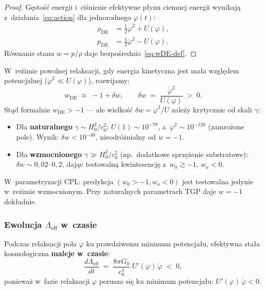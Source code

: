 \begin{proof}
G\k{e}sto\'s\'c energii i~ci\'snienie efektywne p\l{}ynu ciemnej
energii wynikaj\k{a} z~dzia\l{}ania~\eqref{eq:action} dla
jednorodnego $\varphi(t)$:
\begin{align}
    \rho_{\mathrm{DE}} &= \tfrac{1}{2}\dot{\varphi}^2 + U(\varphi),
    \label{eq:rhoDE} \\
    p_{\mathrm{DE}} &= \tfrac{1}{2}\dot{\varphi}^2 - U(\varphi).
    \label{eq:pDE}
\end{align}
R\'ownanie stanu $w = p/\rho$ daje
bezpo\'srednio~\eqref{eq:wDE-def}.
\end{proof}

W~re\.zimie powolnej relaksacji, gdy energia kinetyczna jest
ma\l{}a wzgl\k{e}dem potencjalnej
($\dot{\varphi}^2 \ll U(\varphi)$), rozwijamy:
\begin{equation}\label{eq:wDE-slow}
    w_{\mathrm{DE}} \;\approx\; -1 + \delta w,
    \qquad
    \delta w \;=\; \frac{\dot{\varphi}^2}{U(\varphi)} \;>\; 0.
\end{equation}
St\k{a}d formalnie $w_{\mathrm{DE}} > -1$ --- ale wielko\'s\'c
$\delta w = \dot\varphi^2/U$ zale\.zy krytycznie od skali $\gamma$:
\begin{itemize}[nosep]
  \item Dla \textbf{naturalnego} $\gamma \sim H_0^2/c_0^2$:
        $U(1) \sim 10^{-78}$, a~$\dot\varphi^2 \sim 10^{-120}$
        (zamro\.zone pole). Wynik: $\delta w < 10^{-40}$,
        nieodr\'o\.znialny od $w = -1$.
  \item Dla \textbf{wzmocnionego} $\gamma \gg H_0^2/c_0^2$
        (np.\ dodatkowe sprz\k{e}\.zenie substratowe):
        $\delta w \sim 0{,}02$--$0{,}2$, daj\k{a}c testowaln\k{a}
        kwintesencj\k{e} z~$w_0 \gtrsim -1$, $w_a < 0$.
\end{itemize}
W~parametryzacji CPL: predykcja $(w_0 > -1, w_a < 0)$
jest testowalna jedynie w~re\.zimie wzmocnionym.
Przy naturalnych parametrach TGP daje $w = -1$ dok\l{}adnie.

\subsubsection{Ewolucja $\Lambda_{\mathrm{eff}}$ w~czasie}

\begin{proposition}\label{prop:Lambda-decay}
Podczas relaksacji pola $\varphi$ ku prawdziwemu minimum
potencja\l{}u, efektywna sta\l{}a kosmologiczna
\textbf{maleje w~czasie}:
\begin{equation}\label{eq:Lambda-dot}
  \boxed{
    \frac{d\Lambda_{\mathrm{eff}}}{dt}
    \;=\; \frac{8\pi G_0}{c_0^4}\;U'(\varphi)\,\dot{\varphi}
    \;<\; 0,
  }
\end{equation}
poniewa\.z w~fazie relaksacji $\varphi$ porusza si\k{e} ku
minimum potencja\l{}u: $U'(\varphi)\,\dot{\varphi} < 0$.
\end{proposition}

